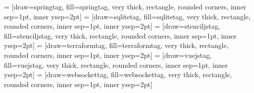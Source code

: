  = [draw=springtag, fill=springtag, very thick, rectangle, rounded corners, inner sep=1pt, inner ysep=2pt]
\newcommand{\springtag}{\begin{tikzpicture}\node [springtag] (box){{\scriptsize \textbf{\phantom{|}Spring\phantom{|}}}};\end{tikzpicture}}
 = [draw=sqlitetag, fill=sqlitetag, very thick, rectangle, rounded corners, inner sep=1pt, inner ysep=2pt]
\newcommand{\sqlitetag}{\begin{tikzpicture}\node [sqlitetag] (box){{\scriptsize \textbf{\phantom{|}SQLite\phantom{|}}}};\end{tikzpicture}}
 = [draw=stenciljstag, fill=stenciljstag, very thick, rectangle, rounded corners, inner sep=1pt, inner ysep=2pt]
\newcommand{\stenciljstag}{\begin{tikzpicture}\node [stenciljstag] (box){{\scriptsize \textbf{\phantom{|}StencilJS\phantom{|}}}};\end{tikzpicture}}
 = [draw=terraformtag, fill=terraformtag, very thick, rectangle, rounded corners, inner sep=1pt, inner ysep=2pt]
\newcommand{\terraformtag}{\begin{tikzpicture}\node [terraformtag] (box){{\scriptsize \color{white}{\textbf{\phantom{|}Terraform\phantom{|}}}}};\end{tikzpicture}}
 = [draw=vuejstag, fill=vuejstag, very thick, rectangle, rounded corners, inner sep=1pt, inner ysep=2pt]
\newcommand{\vuejstag}{\begin{tikzpicture}\node [vuejstag] (box){{\scriptsize \color{white}{\textbf{\phantom{|}Vue.js\phantom{|}}}}};\end{tikzpicture}}
 = [draw=websockettag, fill=websockettag, very thick, rectangle, rounded corners, inner sep=1pt, inner ysep=2pt]
\newcommand{\websockettag}{\begin{tikzpicture}\node [websockettag] (box){{\scriptsize \textbf{\phantom{|}WebSocket\phantom{|}}}};\end{tikzpicture}}

